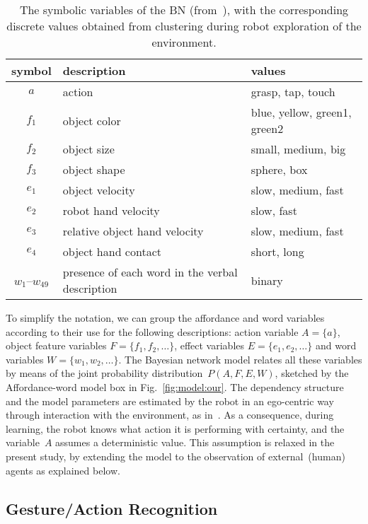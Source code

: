 \begin{table}
    \centering
    \caption{The symbolic variables of the \acl{BN} (from~\cite{salvi:2012:smcb}), with the corresponding discrete values obtained from clustering during robot exploration of the environment.}
    \label{tab:bnsymb}
    \begin{tabular}{cp{3.3cm}l}
    \toprule
    symbol & description     & values \\
    \midrule
    $a$ & action          & grasp, tap, touch \\
    \midrule
    $f_1$ & object color   & blue, yellow, green1, green2 \\
    $f_2$ & object size     & small, medium, big \\
    $f_3$ & object shape    & sphere, box \\
    \midrule
    $e_1$ & object velocity & slow, medium, fast \\
    $e_2$ & robot hand velocity & slow, fast \\
    $e_3$ & relative object hand velocity & slow, medium, fast \\
    $e_4$ & object hand contact & short, long \\
    \midrule
    $w_1$--$w_{49}$ & presence of each word in the verbal description & binary \\
    \bottomrule
    \end{tabular}
\end{table}

To simplify the notation, we can group the affordance and word variables according to their use for the following descriptions: action variable $A = \{a\}$, object feature variables $F=\{f_1, f_2, \dots\}$, effect variables $E=\{e_1, e_2, \dots\}$ and word variables $W = \{w_1, w_2, \dots\}$.
The Bayesian network model relates all these variables by means of the joint probability distribution~$P(A, F, E, W)$, sketched by the Affordance-word model box in Fig.~\ref{fig:model:our}.
The dependency structure and the model parameters are estimated by the robot in an ego-centric way through interaction with the environment, as in~\cite{salvi:2012:smcb}.
As a consequence, during learning, the robot knows what action it is performing with certainty, and the variable~$A$ assumes a deterministic value. This assumption is relaxed in the present study, by extending the model to the observation of external~(human) agents as explained below.

\subsection{Gesture/Action Recognition}

